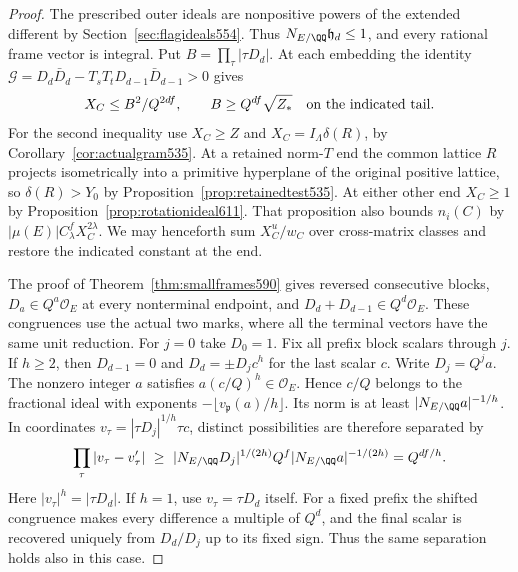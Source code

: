 \documentclass[a4paper,11pt]{article}
\theoremstyle{definition}
\theoremstyle{remark}
\numberwithin{equation}{section}
\begin{document}
\begin{proof}
The prescribed outer ideals are nonpositive powers of the extended
different by Section~\ref{sec:flagideals554}. Thus
\(N_{E/\QQ}\mathfrak h_d\le1\), and every rational frame vector is
integral. Put \(B=\prod_\tau|\tau D_d|\). At each embedding the
identity
\(\mathcal G=D_d\bar D_d-T_sT_tD_{d-1}\bar D_{d-1}>0\) gives
\[
           X_C\le B^2/Q^{2df},\qquad B\ge Q^{df}\sqrt{Z_*}
           \quad\hbox{on the indicated tail}.
\]
For the second inequality use \(X_C\ge Z\) and
\(X_C=I_\Lambda\delta(R)\), by Corollary~\ref{cor:actualgram535}.
At a retained norm-\(T\) end the common lattice \(R\) projects
isometrically into a primitive hyperplane of the original positive
lattice, so \(\delta(R)>Y_0\) by
Proposition~\ref{prop:retainedtest535}. At either other end
\(X_C\ge1\) by Proposition~\ref{prop:rotationideal611}.
That proposition also bounds \(n_i(C)\) by
\(|\mu(E)|C_\lambda^f X_C^{2\lambda}\). We may henceforth sum
\(X_C^u/w_C\) over cross-matrix classes and restore the indicated
constant at the end.

The proof of Theorem~\ref{thm:smallframes590} gives reversed
consecutive blocks, \(D_a\in Q^a\mathcal O_E\) at every nonterminal
endpoint, and \(D_d+D_{d-1}\in Q^d\mathcal O_E\). These congruences
use the actual two marks, where all the terminal vectors have the
same unit reduction. For \(j=0\) take \(D_0=1\).
Fix all prefix block scalars through \(j\). If \(h\ge2\), then
\(D_{d-1}=0\) and \(D_d=\pm D_j c^h\) for the last scalar \(c\).
Write \(D_j=Q^j a\). The nonzero integer \(a\) satisfies
\(a(c/Q)^h\in\mathcal O_E\). Hence \(c/Q\) belongs to the
fractional ideal with exponents
\(-\lfloor v_{\mathfrak p}(a)/h\rfloor\). Its norm is at least
\(|N_{E/\QQ}a|^{-1/h}\). In coordinates
\(v_\tau=|\tau D_j|^{1/h}\tau c\), distinct possibilities are
therefore separated by
\[
 \prod_\tau|v_\tau-v'_\tau|\ \ge\
 |N_{E/\QQ}D_j|^{1/(2h)}Q^f|N_{E/\QQ}a|^{-1/(2h)}
      =Q^{df/h}.
\]
Here \(|v_\tau|^h=|\tau D_d|\). If \(h=1\), use
\(v_\tau=\tau D_d\) itself. For a fixed prefix the shifted
congruence makes every difference a multiple of \(Q^d\), and
the final scalar is recovered uniquely from \(D_d/D_j\) up to
its fixed sign. Thus the same separation holds also in this case.


\end{proof}
\end{document}
